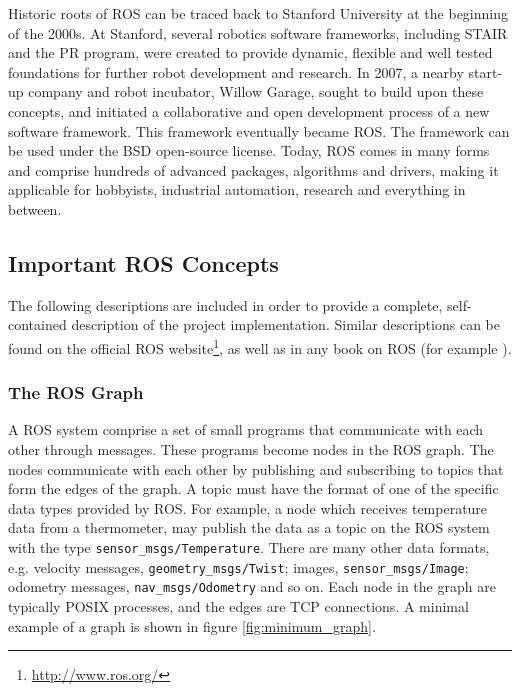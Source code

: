 Historic roots of \ac{ROS} can be traced back to Stanford University at the beginning of the 2000s. At Stanford, several robotics software frameworks, including \ac{STAIR} and the \ac{PR} program, were created to provide dynamic, flexible and well tested foundations for further robot development and research. In 2007, a nearby start-up company and robot incubator, Willow Garage, sought to build upon these concepts, and initiated a collaborative and open development process of a new software framework. This framework eventually became \ac{ROS}\cite{ROS_history}\cite{rosbook15}. The framework can be used under the BSD open-source license\cite{BCD_license}. Today, \ac{ROS} comes in many forms and comprise hundreds of advanced packages, algorithms and drivers, making it applicable for hobbyists, industrial automation, research and everything in between. 

\subsection{Important ROS Concepts}
\label{sec:ros_concepts}
The following descriptions are included in order to provide a complete, self-contained description of the project implementation. Similar descriptions can be found on the official \ac{ROS} website\footnote{\url{http://www.ros.org/}}, as well as in any book on \ac{ROS} (for example \cite{rosbook15}). 

\subsubsection{The ROS Graph}

A \ac{ROS} system comprise a set of small programs that communicate with each other through messages. These programs become nodes in the \ac{ROS} graph. The nodes communicate with each other by publishing and subscribing to topics that form the edges of the graph. A topic must have the format of one of the specific data types provided by \ac{ROS}. For example, a node which receives temperature data from a thermometer, may publish the data as a topic on the \ac{ROS} system with the type \texttt{sensor\_msgs/Temperature}. There are many other data formats, e.g. velocity messages, \texttt{geometry\_msgs/Twist}; images, \texttt{sensor\_msgs/Image}; odometry messages, \texttt{nav\_msgs/Odometry} and so on. Each node in the graph are typically POSIX processes, and the edges are TCP connections\cite{rosbook15}. A minimal example of a graph is shown in figure \ref{fig:minimum_graph}.

